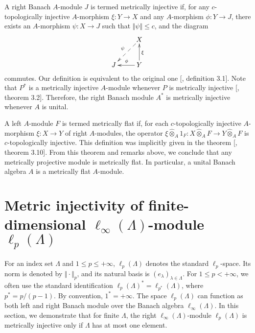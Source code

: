 \documentclass[12pt]{article}
\newcommand{\projmodtens}[1]{\mathbin{\widehat{\otimes}}_{#1}}
\begin{document}
A right Banach $A$-module $J$ is termed metrically injective if, for 
any $c$-topologically injective $A$-morphism $\xi:Y\to X$ and 
any $A$-morphism $\phi:Y\to J$, there exists an $A$-morphism $\psi:X\to J$ such 
that $\Vert\psi\Vert\leq c$, and the diagram
\[
    \xymatrix{
    & {X} \ar@{-->}[dl]_{\psi} \\
    {J} &{Y} \ar[l]_{\phi} \ar[u]_{\xi}}
\]
commutes. Our definition is equivalent to the original 
one [\cite{GravInjProjBanMod}, definition 3.1]. Note that $P^*$ is a metrically 
injective $A$-module whenever $P$ is metrically 
injective [\cite{GravInjProjBanMod}, theorem 3.2]. Therefore, the right Banach 
module $A^*$ is metrically injective whenever $A$ is unital.

A left $A$-module $F$ is termed metrically flat if, for each $c$-topologically 
injective $A$-morphism $\xi:X\to Y$ of right $A$-modules, the 
operator $\xi\projmodtens{A} 1_F:X\projmodtens{A} F\to Y\projmodtens{A} F$ 
is $c$-topologically injective. This definition was implicitly given in the 
theorem [\cite{GravInjProjBanMod}, theorem 3.10]. From this theorem and remarks 
above, we conclude that any metrically projective module is metrically flat. 
In particular, a unital Banach algebra $A$ is a metrically flat $A$-module.


\section{Metric injectivity of finite-dimensional 
\texorpdfstring{$\ell_\infty(\Lambda)$}{linftyLmbd}-module 
\texorpdfstring{$\ell_p(\Lambda)$}{lpLmbd}}
\label{MetrInjlinftynlpn}

For an index set $\Lambda$ and $1\leq p\leq +\infty$, $\ell_p(\Lambda)$ denotes 
the standard $\ell_p$-space. Its norm is denoted by $\Vert\cdot\Vert_p$, and 
its natural basis is $(e_\lambda)_{\lambda\in\Lambda}$. 
For $1\leq p<+\infty$, we often use the standard 
identification $\ell_p(\Lambda)^*=\ell_{p^*}(\Lambda)$, where $p^*=p/(p-1)$. 
By convention, $1^*=+\infty$. The space $\ell_p(\Lambda)$ can function as both 
left and right Banach module over the Banach algebra $\ell_\infty(\Lambda)$. 
In this section, we demonstrate that for finite $\Lambda$, the 
right $\ell_\infty(\Lambda)$-module $\ell_p(\Lambda)$ is metrically injective 
only if $\Lambda$ has at most one element.
\end{document}

